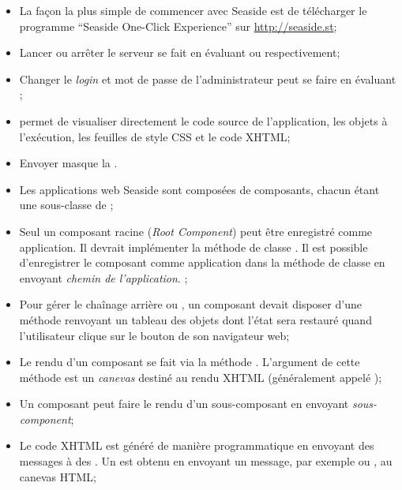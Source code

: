 \documentclass[a4paper,10pt,twoside]{book}
\begin{document}
\begin{itemize}
  \item La façon la plus simple de commencer avec Seaside est de
    télécharger le programme ``Seaside One-Click Experience'' sur
    \url{http://seaside.st};
  \item Lancer ou arrêter le serveur se fait en évaluant  
ou  respectivement;
  \item Changer le \emph{login} et mot de passe de l'administrateur
    peut se faire en évaluant ;
  \item {} permet de visualiser directement le code
    source de l'application, les objets à l'exécution, les feuilles de
    style CSS et le code XHTML;
  \item Envoyer  masque la
    \toolbar.
  \item Les applications web Seaside sont composées de composants,
    chacun étant une sous-classe de ;
  \item Seul un composant racine (\emph{Root Component}) peut être
    enregistré comme application. 
Il devrait implémenter la méthode de classe . Il est
possible d'enregistrer le composant comme application dans la
méthode de classe  en envoyant
 \emph{chemin de l'application}.
; %
  \item Pour gérer le chaînage arrière ou \backtracking, un composant
    devait disposer d'une méthode  renvoyant un tableau des
    objets dont l'état sera restauré quand l'utilisateur clique sur le
    bouton \backbtn de son navigateur web;
  \item Le rendu d'un composant se fait via la méthode
    . L'argument de cette méthode est un
    \emph{canevas} destiné au rendu XHTML (généralement appelé
    );
  \item Un composant peut faire le rendu d'un sous-composant en
    envoyant  \emph{sous-component};
  \item Le code XHTML est généré de manière programmatique en envoyant
    des messages à des \brushes. Un \brush est obtenu en envoyant un
    message, par exemple  ou , au canevas HTML;

\end{itemize}
\end{document}
